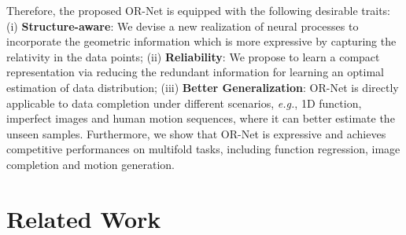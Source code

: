 \documentclass[sigconf]{acmart} %
\newcommand{\eg}{\textit{e.g.}}
\begin{document}
Therefore, the proposed OR-Net is equipped with the following desirable traits:
(i) \textbf{Structure-aware}: We devise a new realization of neural processes to incorporate the geometric information which is more expressive by capturing the relativity in the data points; %
(ii) \textbf{Reliability}: We propose to learn a compact representation via reducing the redundant information for learning an optimal estimation of data distribution; %
(iii) \textbf{Better Generalization}: OR-Net is directly applicable to data completion under different scenarios, \eg, 1D function, imperfect images and human motion sequences, where it can better estimate the unseen samples. 
Furthermore, we show that OR-Net is expressive and achieves competitive performances on multifold tasks, including function regression, image completion and motion generation.








\section{Related Work}
\end{document}
